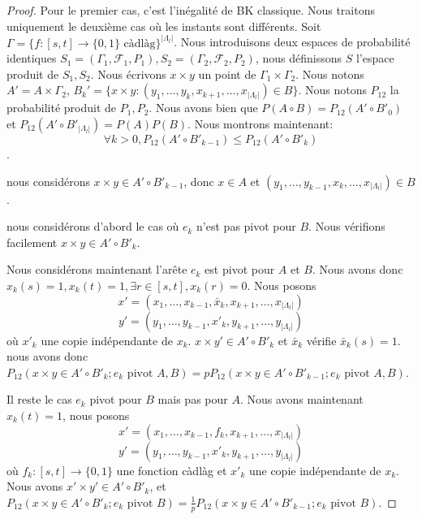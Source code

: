 \documentclass[titlepage,a4paper,12pt]{article}
\begin{document}
\begin{proof}
Pour le premier cas, c'est l'inégalité de BK classique. Nous traitons uniquement le deuxième cas où les instants sont différents. Soit $\Gamma = \{f:[s,t]\rightarrow\{0,1\}\text{ càdlàg} \}^{|\Lambda_l|}$. Nous introduisons deux espaces de probabilité identiques $S_1 = (\Gamma_1,\mathcal{F}_1,P_1), S_2 = (\Gamma_2,\mathcal{F}_2,P_2)$, nous définissons $S$ l'espace produit de $S_1,S_2$. Nous écrivons $x\times y$ un point de $\Gamma_1 \times \Gamma_2$. Nous notons $A' = A\times \Gamma_2$, $B_k' = \{x\times y :(y_1,\dots,y_k,x_{k+1},\dots,x_{|\Lambda_l|}) \in B\}$. Nous notons $P_{12}$ la probabilité produit de $P_1,P_2$. Nous avons bien que $P(A\circ B) = P_{12}(A'\circ B'_0)$ et $P_{12}(A'\circ B'_{|\Lambda_l|}) = P(A)P(B)$. Nous montrons maintenant: $$\forall k>0, P_{12}(A'\circ B'_{k-1}) \leqslant P_{12}(A'\circ B'_k)$$. 

nous considérons $x\times y \in A'\circ B'_{k-1}$, donc $x\in A$ et $(y_1,\dots,y_{k-1},x_k,\dots,x_{|\Lambda_l|})\in B$. 

nous considérons d'abord le cas où $e_k$ n'est pas pivot pour $B$. Nous vérifions facilement $x\times y \in A'\circ B'_k$.

Nous considérons maintenant l'arête $e_k$ est pivot pour $A$ et $B$. Nous avons donc $x_k(s) = 1, x_k(t) =1, \exists r\in [s,t], x_k(r) = 0$. Nous posons $$x'=(x_1,\dots,x_{k-1},\bar{x}_k,x_{k+1},\dots,x_{|\Lambda_l|})$$
$$y'=(y_1,\dots,y_{k-1},x'_k,y_{k+1},\dots,y_{|\Lambda_l|})$$ où $x'_k$ une copie indépendante de $x_k$. $x\times y' \in A'\circ B'_k$ et $\bar{x}_k$ vérifie $\bar{x}_k(s)=1$. nous avons donc $P_{12}(x\times y \in A'\circ B'_k; e_k \text{ pivot }A,B) = pP_{12}(x\times y \in A'\circ B'_{k-1}; e_k \text{ pivot }A,B)$.

Il reste le cas $e_k$ pivot pour $B$ mais pas pour $A$. Nous avons maintenant $x_k(t) = 1$, nous posons 
$$ x'=(x_1,\dots,x_{k-1},f_k,x_{k+1},\dots,x_{|\Lambda_l|})
$$
$$y' =(y_1,\dots,y_{k-1},x'_k,y_{k+1},\dots,y_{|\Lambda_l|})
$$
où $f_k:[s,t]\rightarrow\{0,1\}$ une fonction càdlàg et $x'_k$ une copie indépendante de $x_k$. Nous avons $x'\times y' \in A'\circ B'_k$, et $P_{12}(x\times y \in A'\circ B'_k; e_k \text{ pivot }B) = \frac{1}{p}P_{12}(x\times y \in A'\circ B'_{k-1}; e_k \text{ pivot }B)$.


\end{proof}
\end{document}
